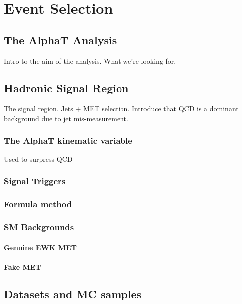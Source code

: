 \chapter{Event Selection}

\ifpdf
    \graphicspath{{Chapter5/Figs/Raster/}{Chapter5/Figs/PDF/}{Chapter5/Figs/}}
\else
    \graphicspath{{Chapter5/Figs/Vector/}{Chapter5/Figs/}}
\fi


\section{The AlphaT Analysis}  %
\label{sec:selection_analysis_overview}

Intro to the aim of the analysis. What we're looking for.

\section{Hadronic Signal Region}
\label{sec:selection_hadronic}
The signal region. Jets + MET selection.
Introduce that QCD is a dominant background due to jet mis-measurement.

\subsection{The AlphaT kinematic variable}
Used to surpress QCD

\subsection{Signal Triggers}

\subsection{Formula method}

\subsection{SM Backgrounds}
\subsubsection{Genuine EWK MET}
\subsubsection{Fake MET}

\section{Datasets and MC samples}